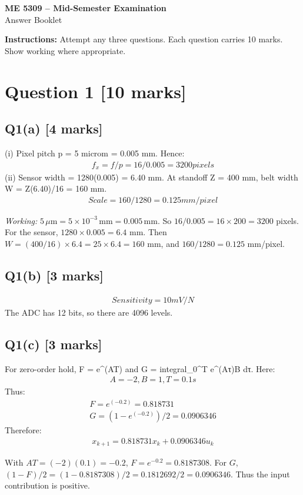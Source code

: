 \documentclass[11pt,a4paper]{article}
\begin{document}
\begin{center}
{\Large\bfseries ME 5309 -- Mid-Semester Examination}\\[3pt]
{\large Answer Booklet}\\[8pt]
\end{center}
\textbf{Instructions:} Attempt any three questions. Each question carries 10 marks. Show working where appropriate.
\section*{Question 1 \hfill [10 marks]}
\subsection*{Q1(a) \hfill [4 marks]}

(i) Pixel pitch p = 5 microm = 0.005 mm.
Hence:\[\begin{aligned}f_x = f/p = 16/0.005 = 3200 pixels\end{aligned}\]
(ii) Sensor width = 1280(0.005) = 6.40 mm.
At standoff Z = 400 mm, belt width W = Z(6.40)/16 = 160 mm.
\[\begin{aligned}Scale = 160/1280 = 0.125 mm/pixel\end{aligned}\]\par\smallskip\textit{Working:} $5\,\mu\mathrm{m}=5\times10^{-3}\,\mathrm{mm}=0.005\,\mathrm{mm}$. So $16/0.005=16\times200=3200$ pixels. For the sensor, $1280\times0.005=6.4$ mm. Then $W=(400/16)\times6.4=25\times6.4=160$ mm, and $160/1280=0.125$ mm/pixel.

\subsection*{Q1(b) \hfill [3 marks]}

\[\begin{aligned}Sensitivity = 10 mV/N\end{aligned}\]
The ADC has 12 bits, so there are 4096 levels.

\subsection*{Q1(c) \hfill [3 marks]}

For zero-order hold, F = e\textasciicircum{}(AT) and G = integral\_0\textasciicircum{}T e\textasciicircum{}(Aτ)B dτ.
Here:\[\begin{aligned}A = -2, B = 1, T = 0.1 s\end{aligned}\]
Thus:\[\begin{aligned}F = e^(-0.2) = 0.818731\\ G = (1-e^(-0.2))/2 = 0.0906346\end{aligned}\]
Therefore:\[\begin{aligned}x_{k+1} = 0.818731 x_k + 0.0906346 u_k\end{aligned}\]\par\smallskip With $AT=(-2)(0.1)=-0.2$, $F=e^{-0.2}=0.8187308$. For $G$, $(1-F)/2=(1-0.8187308)/2=0.1812692/2=0.0906346$. Thus the input contribution is positive.
\end{document}
